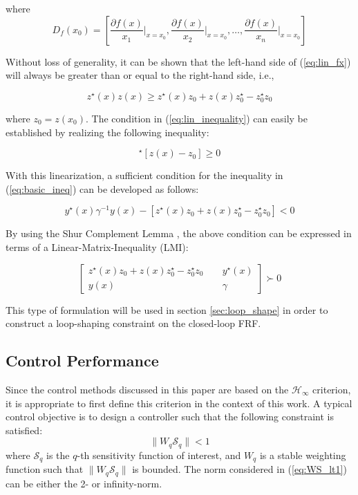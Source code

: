 \documentclass[a4paper, 10pt, conference]{ieeeconf}
\begin{document}
where
$$D_f(x_0) = \left[ \frac{\partial f(x)}{x_1}\Bigr|_{x=x_0}, \frac{\partial f(x)}{x_2}\Bigr|_{x=x_0},\ldots, \frac{\partial f(x)}{x_n}\Bigr|_{x=x_0}\right]$$

Without loss of generality, it can be shown that the left-hand side of (\ref{eq:lin_fx}) will always be greater than or equal to the right-hand side, i.e.,

\begin{equation} \label{eq:lin_inequality}
z^{\star}(x)z(x) \geq z^{\star}(x)z_0 + z(x)z_0^{\star} - z_0^{\star}z_0
\end{equation} 

where $z_0 = z(x_0)$. The condition in (\ref{eq:lin_inequality}) can easily be established by realizing the following inequality:

\begin{equation}
[z(x)-z_0]^{\star}[z(x)-z_0] \geq 0
\end{equation}

With this linearization, a sufficient condition for the inequality in (\ref{eq:basic_ineq}) can be developed as follows:

\begin{equation}
y^{\star}(x) \gamma^{-1} y(x) - [z^{\star}(x)z_0 + z(x)z_0^{\star} - z_0^{\star}z_0]< 0 
\end{equation}

By using the Shur Complement Lemma \cite{BEN09}, the above condition can be expressed in terms of a Linear-Matrix-Inequality (LMI):

\begin{equation} \label{eq:LMI_1}
\begin{bmatrix}
z^{\star}(x)z_0 + z(x)z_0^{\star} - z_0^{\star}z_0 & \phantom{xx} y^{\star}(x) \\
y(x) & \phantom{xx} \gamma
\end{bmatrix}
\succ 0
\end{equation}

This type of formulation will be used in section \ref{sec:loop_shape} in order to construct a loop-shaping constraint on the closed-loop FRF.

\subsection{Control Performance}
Since the control methods discussed in this paper are based on the $\mathcal{H}_\infty$ criterion, it is appropriate to first define this criterion in the context of this work. A typical control objective is to design a controller such that the following constraint is satisfied:
\begin{equation} \label{eq:WS_lt1}
\| W_q \mathcal{S}_q\| < 1
\end{equation}
where $\mathcal{S}_q$ is the $q$-th sensitivity function of interest, and $W_q$ is a stable weighting function such that $\| W_q \mathcal{S}_q\|$ is bounded. The norm considered in (\ref{eq:WS_lt1}) can be either the 2- or infinity-norm. 
\end{document}
